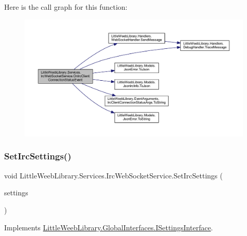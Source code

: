 Here is the call graph for this function\+:\nopagebreak
\begin{figure}[H]
\begin{center}
\leavevmode
\includegraphics[width=350pt]{class_little_weeb_library_1_1_services_1_1_irc_web_socket_service_abd98810f045f0200700d8441a0c14902_cgraph}
\end{center}
\end{figure}
\mbox{\label{class_little_weeb_library_1_1_services_1_1_irc_web_socket_service_a6476ee44ddf292f916b20085c03af5eb}} 
\subsubsection{\texorpdfstring{Set\+Irc\+Settings()}{SetIrcSettings()}}
{\footnotesize\ttfamily void Little\+Weeb\+Library.\+Services.\+Irc\+Web\+Socket\+Service.\+Set\+Irc\+Settings (\begin{DoxyParamCaption}\item[{\mbox{\hyperlink{class_little_weeb_library_1_1_settings_1_1_irc_settings}{Irc\+Settings}}}]{settings }\end{DoxyParamCaption})}



Implements \mbox{\hyperlink{interface_little_weeb_library_1_1_global_interfaces_1_1_i_settings_interface_a9ddf06e247a96d757482b37ddb070e3d}{Little\+Weeb\+Library.\+Global\+Interfaces.\+I\+Settings\+Interface}}.



